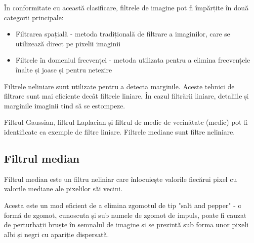 \documentclass[10pt]{article}
\begin{document}
\> În conformitate cu această clasificare, filtrele de imagine pot fi împărțite în două categorii principale:

\begin{itemize}

	\item Filtrarea spațială - metoda tradițională de filtrare a imaginilor, care se utilizează direct pe pixelii imaginii
	\item Filtrele în domeniul frecvenței - metoda utilizata pentru a elimina frecvențele înalte și joase și pentru netezire
	
\end{itemize}

\> Filtrele neliniare sunt utilizate pentru a detecta marginile. Aceste tehnici de filtrare sunt mai eficiente decât filtrele liniare.
În cazul filtrării liniare, detaliile și marginile imaginii tind să se estompeze.

\> Filtrul Gaussian, filtrul Laplacian și filtrul de medie de vecinătate (medie) pot fi identificate ca exemple de filtre liniare.
Filtrele mediane sunt filtre neliniare.

\newpage

\subsection{Filtrul median}

\> Filtrul median este un filtru neliniar care înlocuiește valorile fiecărui pixel cu valorile mediane ale pixelilor săi vecini.


\> Acesta este un mod eficient de a elimina zgomotul de tip "salt and pepper" - o formă de zgomot, cunoscuta și sub numele de 
zgomot de impuls, poate fi cauzat de perturbații bruște în semnalul de imagine si se prezintă sub forma unor pixeli albi și negri cu apariție dispersată.
\end{document}
